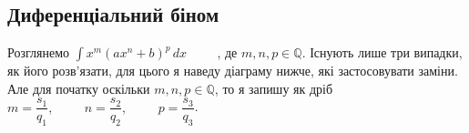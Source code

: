 \documentclass[a4paper, 10pt]{article}
\def\huge{\displaystyle}
\theoremstyle{theoremdd}
\theoremstyle{theoremdd}
\theoremstyle{theoremdd}
\theoremstyle{theoremdd}
\theoremstyle{theoremdd}
\theoremstyle{theoremdd}
\theoremstyle{theoremdd}
\theoremstyle{theoremdd}
\theoremstyle{theoremdd}
\begin{document}
\subsection{Диференціальний біном}
Розглянемо $\huge \int x^m (ax^n + b)^p\,dx \hspace{1cm}$, де $m,n,p \in \mathbb{Q}$. Існують лише три випадки, як його розв'язати, для цього я наведу діаграму нижче, які застосовувати заміни.\\
Але для початку оскільки $m,n,p \in \mathbb{Q}$, то я запишу як дріб $m= \dfrac{s_1}{q_1},\hspace{1cm} n = \dfrac{s_2}{q_2},\hspace{1cm} p = \dfrac{s_3}{q_3}$.\\
\\
\end{document}
